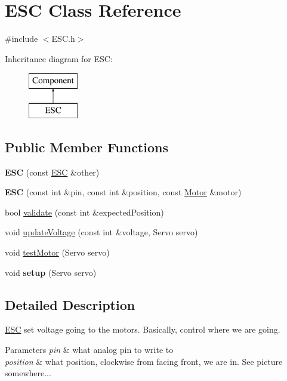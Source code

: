 \hypertarget{classESC}{}\section{E\+S\+C Class Reference}
\label{classESC}


{\ttfamily \#include $<$E\+S\+C.\+h$>$}

Inheritance diagram for E\+S\+C\+:\begin{figure}[H]
\begin{center}
\leavevmode
\includegraphics[height=2.000000cm]{classESC}
\end{center}
\end{figure}
\subsection*{Public Member Functions}
\begin{DoxyCompactItemize}
\item 
\hypertarget{classESC_a7ae93948d946f9caec8387fa85bc3151}{}{\bfseries E\+S\+C} (const \hyperlink{classESC}{E\+S\+C} \&other)\label{classESC_a7ae93948d946f9caec8387fa85bc3151}

\item 
\hypertarget{classESC_a81e60257cfab0a0ca108da5488ac682e}{}{\bfseries E\+S\+C} (const int \&pin, const int \&position, const \hyperlink{classMotor}{Motor} \&motor)\label{classESC_a81e60257cfab0a0ca108da5488ac682e}

\item 
bool \hyperlink{classESC_abe83b1fc646f0b1bd77d50b215d668d7}{validate} (const int \&expected\+Position)
\item 
void \hyperlink{classESC_a580839cc20de6686c6d249666a196654}{update\+Voltage} (const int \&voltage, Servo servo)
\item 
void \hyperlink{classESC_a6b32c823658b831664e1c73975adbc22}{test\+Motor} (Servo servo)
\item 
\hypertarget{classESC_a96ba41d5c6722e4544715e1871f19bc4}{}void {\bfseries setup} (Servo servo)\label{classESC_a96ba41d5c6722e4544715e1871f19bc4}

\end{DoxyCompactItemize}


\subsection{Detailed Description}
\hyperlink{classESC}{E\+S\+C} set voltage going to the motors. Basically, control where we are going. 
\begin{DoxyParams}{Parameters}
{\em pin} & what analog pin to write to \\
\hline
{\em position} & what position, clockwise from facing front, we are in. See picture somewhere... \\
\hline
\end{DoxyParams}


